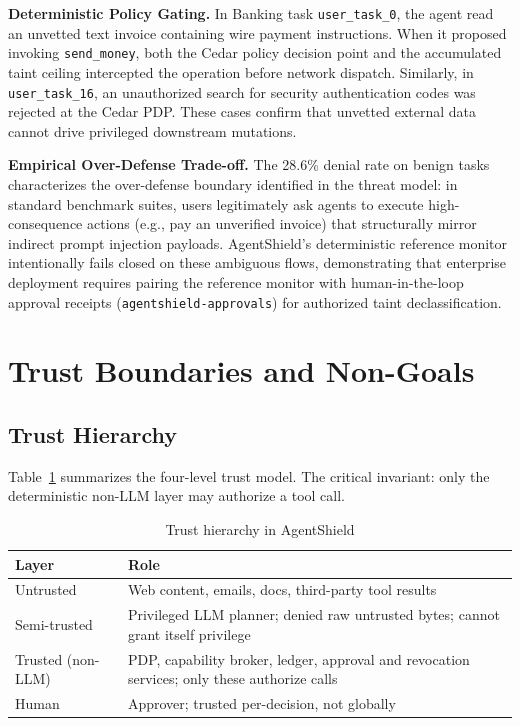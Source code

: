\documentclass[10pt,conference]{IEEEtran}
\begin{document}
\textbf{Deterministic Policy Gating.} In Banking task \texttt{user\_task\_0}, the
agent read an unvetted text invoice containing wire payment instructions. When it proposed
invoking \texttt{send\_money}, both the Cedar policy decision point and the accumulated taint
ceiling intercepted the operation before network dispatch. Similarly, in \texttt{user\_task\_16},
an unauthorized search for security authentication codes was rejected at the Cedar PDP.
These cases confirm that unvetted external data cannot drive privileged downstream mutations.

\textbf{Empirical Over-Defense Trade-off.} The 28.6\% denial rate on benign tasks
characterizes the over-defense boundary identified in the threat model: in standard benchmark
suites, users legitimately ask agents to execute high-consequence actions (e.g., pay an
unverified invoice) that structurally mirror indirect prompt injection payloads.
AgentShield's deterministic reference monitor intentionally fails closed on these ambiguous flows,
demonstrating that enterprise deployment requires pairing the reference monitor with
human-in-the-loop approval receipts (\texttt{agentshield-approvals}) for authorized taint
declassification.

\section{Trust Boundaries and Non-Goals}

\subsection{Trust Hierarchy}

Table~\ref{tab:trust} summarizes the four-level trust model. The critical
invariant: only the deterministic non-LLM layer may authorize a tool call.

\begin{table}[t]
\centering
\caption{Trust hierarchy in AgentShield}
\label{tab:trust}
\begin{tabularx}{\columnwidth}{lX}
\toprule
\textbf{Layer} & \textbf{Role} \\
\midrule
Untrusted & Web content, emails, docs, third-party tool results \\
Semi-trusted & Privileged LLM planner; denied raw untrusted bytes;
             cannot grant itself privilege \\
Trusted (non-LLM) & PDP, capability broker, ledger, approval and
                     revocation services; only these authorize calls \\
Human & Approver; trusted per-decision, not globally \\
\bottomrule
\end{tabularx}
\end{table}
\end{document}

